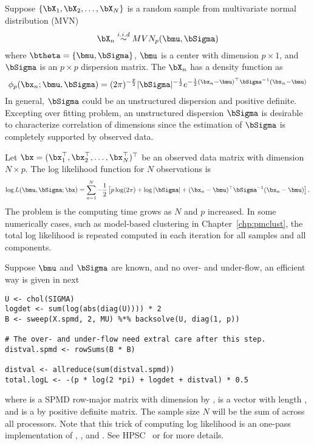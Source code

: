 Suppose $\{\bX_1,\bX_2,\ldots,\bX_N\}$ is a random sample from
multivariate normal distribution
(MVN)
\begin{equation}
\bX_n \stackrel{i.i.d}{\sim} MVN_p(\bmu, \bSigma)
\label{eqn:mvn_p}
\end{equation}
where $\btheta = \{\bmu, \bSigma\}$, $\bmu$ is a center with
dimension $p\times 1$, and $\bSigma$ is an $p\times p$ dispersion
matrix.
The $\bX_n$ has a density function as
\begin{equation*}
\displaystyle
\phi_p(\bx_n; \bmu, \bSigma) =
(2\pi)^{-\frac{p}{2}} |\bSigma|^{-\frac{1}{2}}
e^{-\frac{1}{2} (\bx_n - \bmu)^\top \bSigma^{-1} (\bx_n - \bmu)}
\end{equation*}
In general, $\bSigma$ could be an unstructured dispersion and positive
definite. Excepting over fitting problem,
an unstructured dispersion $\bSigma$ is desirable to
characterize correlation of dimensions since the estimation of
$\bSigma$ is completely supported by observed data.

Let $\bx = (\bx_1^\top, \bx_2^\top, \ldots, \bx_N^\top)^\top$
be an observed data matrix with dimension $N\times p$.
The log likelihood function for $N$ observations is
\begin{equation*}
\displaystyle
\log L(\bmu, \bSigma; \bx) = \sum_{n = 1}^N
-\frac{1}{2}
\left[
p\log(2\pi) + \log|\bSigma| + (\bx_n - \bmu)^\top \bSigma^{-1} (\bx_n - \bmu)
\right].
\label{eqn:log_likelihood_mvn_p}
\end{equation*}
The problem is the computing time grows as $N$ and $p$ increased.
In some numerically cases, such as model-based clustering
in Chapter~\ref{chp:pmclust}, the total log likelihood is
repeated computed in each iteration for all samples and all components.

Suppose $\bmu$ and $\bSigma$ are known, and no over- and under-flow,
an efficient way is given in next
\begin{lstlisting}[language=rr,title=R Code]
U <- chol(SIGMA)
logdet <- sum(log(abs(diag(U)))) * 2
B <- sweep(X.spmd, 2, MU) %*% backsolve(U, diag(1, p))

# The over- and under-flow need extral care after this step.
distval.spmd <- rowSums(B * B)

distval <- allreduce(sum(distval.spmd))
total.logL <- -(p * log(2 *pi) + logdet + distval) * 0.5
\end{lstlisting}
where  is a SPMD row-major matrix with dimension
 by ,  is a vector with length , and
 is a  by  positive definite matrix.
The sample size $N$ will be the sum of  across all processors.
Note that this trick of computing log likelihood is an one-pass implementation
of , , and .
See HPSC~\citep{hpsc2011} or \citet{gvl} for more details.





